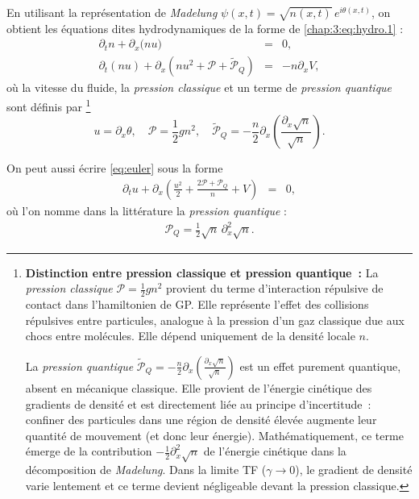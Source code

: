 En utilisant la représentation de \emph{Madelung} $\psi(x,t) = \sqrt{n(x,t)}\, e^{i\theta(x,t)}$, on obtient les équations dites hydrodynamiques de la forme de \eqref{chap:3:eq:hydro.1} \cite{Spiegel1980FluidDF,10.1093/acprof:oso/9780198758884.001.0001} :  
\begin{eqnarray}
    \partial_t n + \partial_x \big( n u \big) &=& 0, \label{eq:continuite}\\
    \partial_t (n u) + \partial_x \left( n u^2 + \mathcal{P} + \tilde{\mathcal{P}}_Q \right) &=& - n \partial_x V , \label{eq:euler}
\end{eqnarray}
où la vitesse du fluide, la \emph{pression classique} et un terme de \emph{pression quantique} sont définis par
\footnote{
\textbf{Distinction entre pression classique et pression quantique~:}
La \emph{pression classique} $\mathcal{P} = \frac{1}{2}gn^2$ provient du terme d'interaction répulsive de contact dans l'hamiltonien de \gls{GP}. Elle représente l'effet des collisions répulsives entre particules, analogue à la pression d'un gaz classique due aux chocs entre molécules. Elle dépend uniquement de la densité locale $n$.

La \emph{pression quantique} $\tilde{\mathcal{P}}_Q = -\frac{n}{2}\partial_x\left(\frac{\partial_x\sqrt{n}}{\sqrt{n}}\right)$ est un effet purement quantique, absent en mécanique classique. Elle provient de l'énergie cinétique des gradients de densité et est directement liée au principe d'incertitude~: confiner des particules dans une région de densité élevée augmente leur quantité de mouvement (et donc leur énergie). Mathématiquement, ce terme émerge de la contribution $-\frac{1}{2}\partial_x^2\sqrt{n}$ de l'énergie cinétique dans la décomposition de \emph{Madelung}. Dans la limite \acrfull{TF} ($\gamma \to 0$), le gradient de densité varie lentement et ce terme devient négligeable devant la pression classique.
}
\begin{equation}\label{eq:vitesse}
    u = \partial_x \theta, \quad 
    \mathcal{P} = \frac{1}{2} g n^2 , \quad 
    \tilde{\mathcal{P}}_Q = - \frac{n}{2} \partial_x \left( \frac{\partial_x \sqrt{n}}{\sqrt{n}} \right) .
\end{equation}


On peut aussi écrire \eqref{eq:euler} sous la forme
\begin{eqnarray}
	\partial_t u + \partial_x \left( \frac{u^2}{2} + \frac{2 \mathcal{P} + \mathcal{P}_Q}{n} + V \right) &=& 0, \label{eq:euler2}	
\end{eqnarray}
où l'on nomme dans la littérature la \emph{pression quantique} :
\begin{eqnarray}
	\mathcal{P}_Q = \frac{1}{2} \sqrt{n} \, \partial_x^2 \sqrt{n}.
\end{eqnarray}

